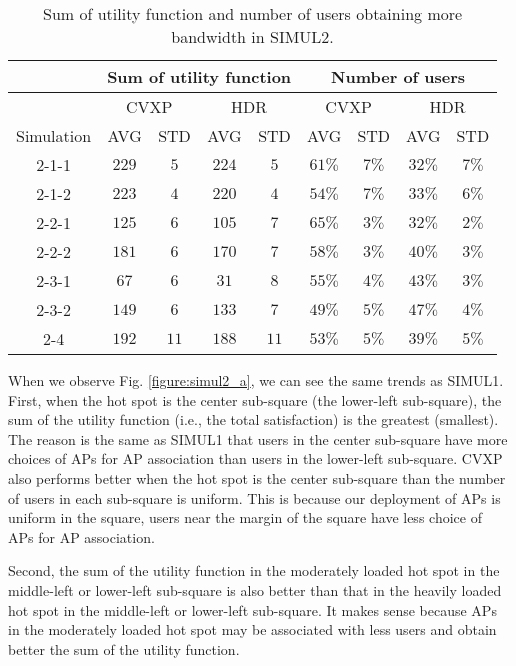 	\begin{table} \small
		\centering \caption{Sum of utility function and number of users obtaining more bandwidth in SIMUL2.}
		\renewcommand\arraystretch{1.0}
		\begin{tabular}{|c||c|c||c|c||c|c||c|c|} %
			\hline
			&\multicolumn{4}{|c||}{Sum of utility function} & \multicolumn {4}{|c|}{Number of users} \\
			\hline & \multicolumn{2}{|c||}{CVXP} & \multicolumn{2}{|c||}{HDR} & \multicolumn{2}{|c||}{CVXP} & \multicolumn{2}{|c|}{HDR} \\
			\hline	Simulation & AVG & STD & AVG & STD & AVG & STD & AVG & STD \\
			\hline
			\hline	2-1-1 & $229$ & $5$ & $224$ & $5$ & $61\%$ & $7\%$ & $32\%$ & $7\%$ \\
			\hline	2-1-2 & $223$ & $4$ & $220$ & $4$ & $54\%$ & $7\%$ & $33\%$ & $6\%$ \\
			\hline	2-2-1 & $125$ & $6$ & $105$ & $7$ & $65\%$ & $3\%$ & $32\%$ & $2\%$ \\
			\hline	2-2-2 & $181$ & $6$ & $170$ & $7$ & $58\%$ & $3\%$ & $40\%$ & $3\%$ \\
			\hline	2-3-1 & $67$ & $6$ & $31$ & $8$ & $55\%$ & $4\%$ & $43\%$ & $3\%$ \\
			\hline	2-3-2 & $149$ & $6$ & $133$ & $7$ & $49\%$ & $5\%$ & $47\%$ & $4\%$ \\
			\hline	2-4 & $192$ & $11$ & $188$ & $11$ & $53\%$ & $5\%$ & $39\%$ & $5\%$ \\
			\hline
		\end{tabular}\label{Tab:simul2}
	\end{table}	
	When we observe Fig. \ref{figure:simul2_a}, we can see the same trends as SIMUL1. First, when the hot spot is the center sub-square (the lower-left sub-square), the sum of the utility function (i.e., the total satisfaction) is the greatest (smallest). The reason is the same as SIMUL1 that users in the center sub-square have more choices of APs for AP association than users in the lower-left sub-square. CVXP also performs better when the hot spot is the center sub-square than the number of users in each sub-square is uniform. This is because our deployment of APs is uniform in the square, users near the margin of the square have less choice of APs for AP association.
	
	Second, the sum of the utility function in the moderately loaded hot spot in the middle-left or lower-left sub-square is also better than that in the heavily loaded hot spot in the middle-left or lower-left sub-square. It makes sense because APs in the moderately loaded hot spot may be associated with less users and obtain better the sum of the utility function.
	
